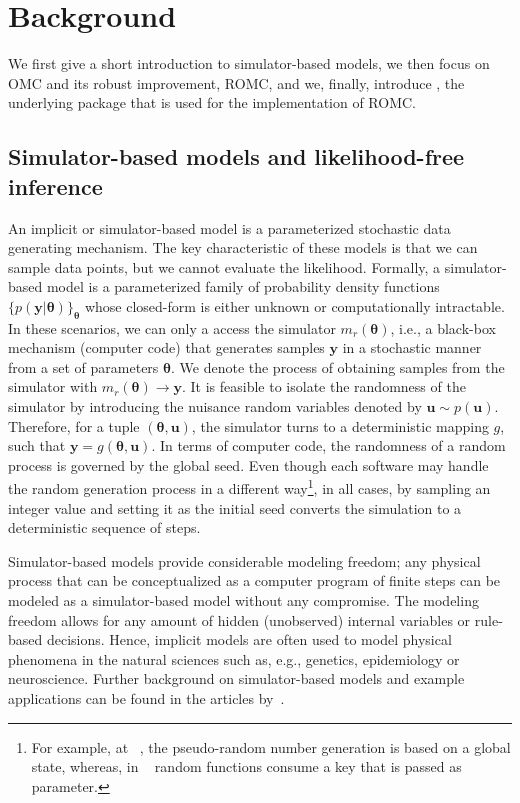 \documentclass[article]{jss}
\newcommand{\ub}{\mathbf{u}}
\newcommand{\yb}{\mathbf{y}}
\newcommand{\thetab}{\boldsymbol{\theta}}
\newcommand{\simulator}{g}
\begin{document}
\section{Background}

We first give a short introduction to simulator-based models, we then
focus on OMC and its robust improvement, ROMC, and we, finally,
introduce , the underlying package that is used for the
implementation of ROMC.

\subsection{Simulator-based models and likelihood-free inference}

An implicit or simulator-based model is a parameterized stochastic
data generating mechanism. The key characteristic of these models is
that we can sample data points, but we cannot evaluate the
likelihood. Formally, a simulator-based model is a parameterized
family of probability density functions
\(\{ p(\yb|\thetab)\}_{\thetab}\) whose closed-form is either unknown
or computationally intractable. In these scenarios, we can only a
access the simulator \( m_r(\thetab) \), i.e., a black-box mechanism
(computer code) that generates samples \(\yb\) in a stochastic manner
from a set of parameters \(\thetab\). We denote the process of
obtaining samples from the simulator with
\( m_r(\thetab) \rightarrow \yb \). It is feasible to isolate the
randomness of the simulator by introducing the nuisance random
variables denoted by \(\ub \sim p(\ub)\). Therefore, for a tuple
\((\thetab, \ub)\), the simulator turns to a deterministic mapping
\(g\), such that \(\yb=\simulator(\thetab,\ub)\). In terms of computer
code, the randomness of a random process is governed by the global
seed. Even though each software may handle the random generation
process in a different way\footnote{For example, at
  ~\citet{harris2020array}, the pseudo-random number
  generation is based on a global state, whereas, in
  ~\citet{jax2018github} random functions consume a key that
  is passed as parameter. }, in all cases, by sampling an integer value
and setting it as the initial seed converts the simulation to a
deterministic sequence of steps.

Simulator-based models provide considerable modeling freedom; any
physical process that can be conceptualized as a computer program of
finite steps can be modeled as a simulator-based model without any
compromise. The modeling freedom allows for any amount of hidden
(unobserved) internal variables or rule-based decisions. Hence,
implicit models are often used to model physical phenomena in the
natural sciences such as, e.g., genetics, epidemiology or
neuroscience. Further background on simulator-based models and
example applications can be found in the articles
by~\citet{gutmann2016, lintusaari2017, sisson2018, cranmer2020}.
\end{document}
